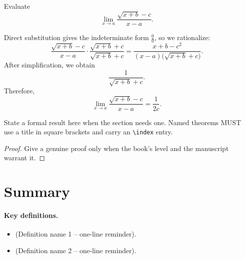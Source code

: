 \begin{workedexample}
\begin{example}
Evaluate
\[
\lim_{x\to a}\frac{\sqrt{x+b}-c}{x-a}.
\]
\end{example}

\begin{solution}
Direct substitution gives the indeterminate form \(\frac{0}{0}\), so we
rationalize:
\[
\frac{\sqrt{x+b}-c}{x-a}
\cdot
\frac{\sqrt{x+b}+c}{\sqrt{x+b}+c}
=
\frac{x+b-c^2}{(x-a)\bigl(\sqrt{x+b}+c\bigr)}.
\]
After simplification, we obtain
\[
\frac{1}{\sqrt{x+b}+c}.
\]
Therefore,
\[
\lim_{x\to a}\frac{\sqrt{x+b}-c}{x-a}
=
\frac{1}{2c}.
\]
\end{solution}
\end{workedexample}


\begin{theorem}
State a formal result here when the section needs one. Named theorems MUST
use a title in square brackets and carry an \texttt{\textbackslash index}
entry.
\end{theorem}

\begin{proof}
Give a genuine proof only when the book's level and the manuscript warrant it.
\end{proof}

\section*{Summary}


\paragraph{Key definitions.}
\begin{itemize}
    \item (Definition name 1 -- one-line reminder).
    \item (Definition name 2 -- one-line reminder).
\end{itemize}

